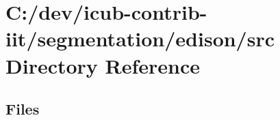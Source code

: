 \section{C\+:/dev/icub-\/contrib-\/iit/segmentation/edison/src Directory Reference}
\label{dir_464331d1be936f6c28eeb08bec1bc3b6}
\subsection*{Files}
\begin{DoxyCompactItemize}
\end{DoxyCompactItemize}
